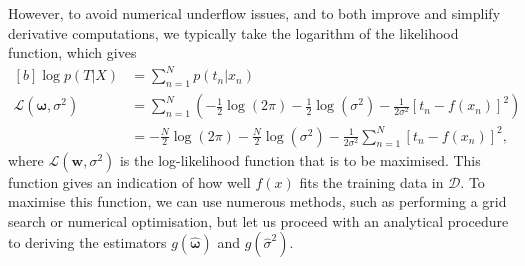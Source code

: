 \documentclass{article}
\begin{document}
However, to avoid numerical underflow issues, and to both improve and simplify derivative computations, we typically take the logarithm of the likelihood function, which gives
\begin{equation}\label{eq:Q2_log_likelihood_function}
\begin{aligned}[b]
\log p(T \vert X) &= \sum_{n=1}^{N} p(t_n \vert x_n) \\
\mathcal{L}(\boldsymbol\omega, \sigma^2) &= \sum_{n=1}^{N} \left( -\frac{1}{2}\log \left( 2\pi \right) -\frac{1}{2}\log \left( \sigma^2 \right) - \frac{1}{2\sigma^2} \left[ t_n - f(x_n)\right] ^2 \right) \\
&= -\frac{N}{2}\log \left( 2\pi \right) - \frac{N}{2}\log \left( \sigma^2 \right) - \frac{1}{2\sigma^2}\sum_{n=1}^{N}\left[ t_n - f(x_n)\right] ^2,
\end{aligned}
\end{equation}
where $\mathcal{L}(\mathbf{w}, \sigma^2)$ is the log-likelihood function that is to be maximised. This function gives an indication of how well $f(x)$ fits the training data in $\mathcal{D}$. To maximise this function, we can use numerous methods, such as performing a grid search or numerical optimisation, but let us proceed with an analytical procedure to deriving the estimators $g(\hat{\boldsymbol\omega})$ and $g(\hat{\sigma}^2)$. 
\end{document}
